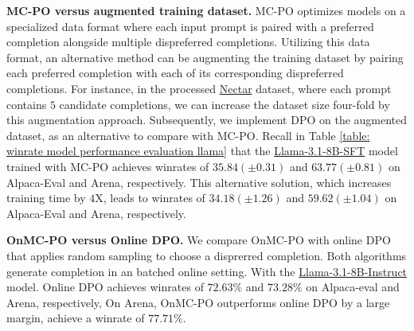 \textbf{MC-PO versus augmented training dataset.}
MC-PO optimizes models on a specialized data format where each input prompt is paired with a preferred completion alongside multiple dispreferred completions. 
Utilizing this data format, an alternative method can be augmenting the training dataset by pairing each preferred completion with each of its corresponding dispreferred completions. 
For instance, in the processed \href{https://huggingface.co/datasets/berkeley-nest/Nectar}{Nectar} dataset, where each prompt contains $5$ candidate completions, we can increase the dataset size four-fold by this augmentation approach. 
Subsequently, we implement DPO on the augmented dataset, as an alternative to compare with MC-PO. 
Recall in Table \ref{table: winrate model performance evaluation llama} that the {\href{https://huggingface.co/allenai/Llama-3.1-Tulu-3-8B-SFT}{Llama-3.1-8B-SFT}} model trained with MC-PO achieves winrates of $35.84(\pm0.31)$ and $63.77(\pm0.81)$ on Alpaca-Eval and Arena, respectively. 
This alternative solution, which increases training time by $4$X, leads to winrates of $34.18(\pm1.26)$ and $59.62(\pm1.04)$ on Alpaca-Eval and Arena, respectively.


\textbf{OnMC-PO versus Online DPO.}
We compare OnMC-PO with online DPO \citep{guo2024direct} that applies random sampling to choose a disprerred completion.
Both algorithms generate completion in an batched online setting.
With the \href{https://huggingface.co/meta-llama/Llama-3.1-8B-Instruct}{Llama-3.1-8B-Instruct} model.
Online DPO achieves winrates of $72.63 \%$ and $73.28 \%$ on Alpaca-eval and Arena, respectively,
On Arena,
OnMC-PO outperforms online DPO by a large margin, achieve a winrate of $77.71 \%$.
